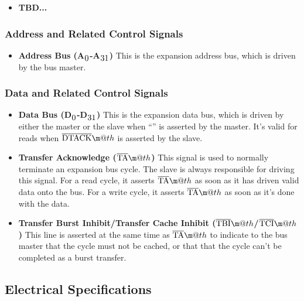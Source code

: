 \documentclass{article}
\makeatletter
\newcommand*{\textoverline}[1]{$\overline{\hbox{#1}}\m@th$}
\newcommand{\textss}[1]{$_{\hbox{#1}}$}
\makeatother
\begin{document}
\begin{itemize}
	\item{\textbf{TBD...}}
\end{itemize}

\subsubsection{Address and Related Control Signals}

\begin{itemize}

	\item{\textbf{Address Bus (A\textss{0}-A\textss{31})}} This is the
	expansion address bus, which is driven by the bus master.

\end{itemize}

\subsubsection{Data and Related Control Signals}

\begin{itemize}
	\item{\textbf{Data Bus (D\textss{0}-D\textss{31})}} This is the
	expansion data bus, which is driven by either the master or the slave
	when ``'' is asserted by the master. It's valid for reads when
	\textoverline{DTACK} is asserted by the slave.

	\item{\textbf{Transfer Acknowledge (\textoverline{TA})}} This
	signal is used to normally terminate an expansion bus cycle. The slave
	is always responsible for driving this signal. For a read cycle, it
	asserts \textoverline{TA} as soon as it has driven valid data onto
	the bus. For a write cycle, it asserts \textoverline{TA} as soon as
	it's done with the data.

\item{\textbf{Transfer Burst Inhibit/Transfer Cache Inhibit (\textoverline{TBI}/\textoverline{TCI})}}
	This line is asserted at the same time as \textoverline{TA} to indicate
	to the bus master that the cycle must not be cached, or that that the
	cycle can't be completed as a burst transfer.
\end{itemize}

\subsection{Electrical Specifications}
\end{document}
